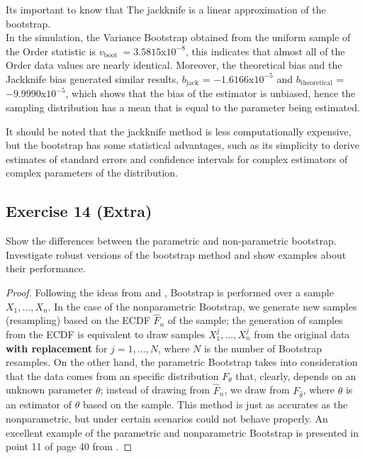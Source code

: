 \documentclass[11pt]{article}
\theoremstyle{definition}
\theoremstyle{remark}
\theoremstyle{remark}
\begin{document}
Its important to know that The jackknife is a linear approximation of
the bootstrap.
\\

In the simulation, the Variance Bootstrap obtained from the uniform
sample of the Order statistic is
$v_{\text {boot }} = 3.5815$x$10^{-8}$, this indicates that almost all
of the Order data values are nearly identical. Moreover, the
theoretical bias and the Jackknife bias generated similar results,
$b_{\mathrm{jack}}$ = $-1.6166$x$10^{-5}$ and
$b_{\mathrm{theoretical}}$ = $-9.9990$x$10^{-5}$, which shows that the
bias of the estimator is unbiased, hence the sampling distribution has
a mean that is equal to the parameter being estimated.


It should be noted that the jackknife method is less computationally
expensive, but the bootstrap has some statistical advantages, such as
its simplicity to derive estimates of standard errors and confidence
intervals for complex estimators of complex parameters of the
distribution.


\subsection*{Exercise 14 (Extra)}
Show the differences between the parametric and non-parametric
bootstrap. Investigate robust versions of the bootstrap method and
show examples about their performance.

\begin{proof}
  Following the ideas from \cite{wasserman2006} and
  \cite{kulperger2018}, Bootstrap is performed over a sample
  $X_1,...,X_n$. In the case of the nonparametric Bootstrap, we
  generate new samples (resampling) based on the ECDF $\hat{F}_n$ of
  the sample; the generation of samples from the ECDF is equivalent to
  draw samples $X_1^j,...,X_n^j$ from the original data \textbf{with
    replacement} for $j=1,...,N$, where $N$ is the number of Bootstrap
  resamples. On the other hand, the parametric Bootstrap takes into
  consideration that the data comes from an specific distribution
  $F_\theta$ that, clearly, depends on an unknown parameter $\theta$;
  instead of drawing from $\hat{F}_n$, we draw from
  $F_{\hat{\theta}}$, where $\hat{\theta}$ is an estimator of $\theta$
  based on the sample. This method is just as accurates as the
  nonparametric, but under certain scenarios could not behave
  properly. An excellent example of the parametric and nonparametric
  Bootstrap is presented in point 11 of page 40 from
  \cite{wasserman2006}.

\end{proof}
\end{document}
